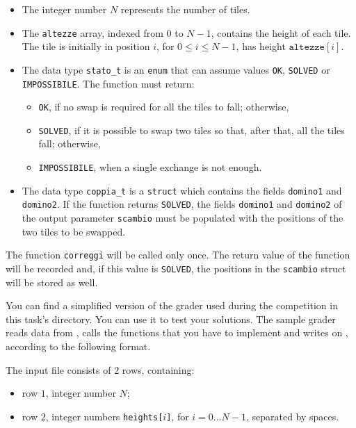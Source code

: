 \begin{itemize}[nolistsep]
  \item The integer number $N$ represents the number of tiles.
  \item
    The \texttt{altezze} array, indexed from $0$ to $N-1$, contains the height of each tile.
    The tile is initially in position $i$, for $0 \leq i \leq N-1$, has height $\texttt{altezze}[i]$.
  \item
    The data type \texttt{stato\_t} is an \texttt{enum} that can assume values
    \texttt{OK}, \texttt{SOLVED} or \texttt{IMPOSSIBILE}.
    The function must return:
    \begin{itemize}
      \item \texttt{OK}, if no swap is required for all the tiles to fall; otherwise,
      \item \texttt{SOLVED},
        if it is possible to swap two tiles
        so that, after that, all the tiles fall; otherwise,
      \item \texttt{IMPOSSIBILE},
        when a single exchange is not enough.
    \end{itemize}
  \item
    The data type \texttt{coppia\_t} is a \texttt{struct} which contains the fields
    \texttt{domino1} and \texttt{domino2}.
    If the function returns \texttt{SOLVED},
    the fields \texttt{domino1} and \texttt{domino2}
    of the output parameter \texttt{scambio}
    must be populated with the positions of the two tiles to be swapped.
\end{itemize}

The function \texttt{correggi} will be called only once.
The return value of the function will be recorded and,
if this value is \texttt{SOLVED},
the positions in the \texttt{scambio} struct will be stored as well.



\Grader
You can find a simplified version of the grader used during the competition in this task's directory. You can use it to test your solutions. The sample grader reads data from , calls the functions that you have to implement and writes on \outputfile{}, according to the following format.

The input file consists of $2$ rows, containing:
\begin{itemize}[nolistsep,itemsep=2mm]
\item row $1$, integer number $N$;
\item row $2$, integer numbers \texttt{heights[$i$]}, for $i = 0\ldots N-1$, separated by spaces.
\end{itemize}

